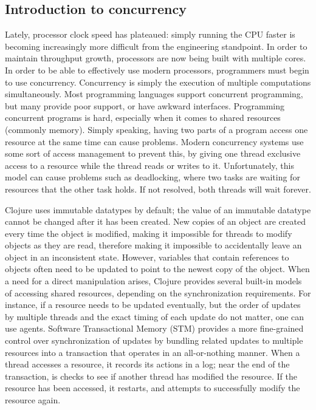 \documentclass[12pt]{article}
\newcommand{\comment}[1]{{\bf \tt  {#1}}}
\newcommand{\emcomment}[1]{\textcolor{ForestGreen}{\comment{Elena: {#1}}}}
\begin{document}
\subsection{Introduction to concurrency}\label{sec:concurrency}
 Lately, processor clock speed has plateaued: simply running the CPU faster is becoming increasingly more difficult from the engineering standpoint. 
In order to maintain throughput growth, processors are now being built with multiple cores. In order to be able to effectively use modern processors, programmers must begin to use concurrency. Concurrency is simply the execution of multiple computations simultaneously. Most programming languages support concurrent programming, but many provide poor support, or have awkward interfaces. 
Programming concurrent programs is hard, especially when it comes to shared resources (commonly memory). Simply speaking, having two parts of a program access one resource at the same time can cause problems. Modern concurrency systems use some sort of access management to prevent this, by giving one thread exclusive access to a resource while the thread reads or writes to it. Unfortunately, this model can cause problems such as deadlocking, where two tasks are waiting for resources that the other task holds. If not resolved, both threads will wait forever. 

Clojure uses immutable datatypes by default; the value of an immutable datatype cannot be changed after it has been created. New copies of an object are created every time the object is modified, making it impossible for threads to modify objects as they are read, therefore making it impossible to accidentally leave an object in an inconsistent state. 
However, variables that contain references to objects often need to be updated to point to the newest copy of the object. When a need for a direct manipulation arises, 
Clojure provides several built-in models of accessing shared resources, depending on the synchronization requirements. For instance, if a resource needs to be updated eventually, but the order of updates by multiple threads and the exact timing of each update do not matter, one can use agents. Software Transactional Memory (STM) provides a more fine-grained control over synchronization of updates by bundling related updates to multiple resources into a transaction that operates in an all-or-nothing manner. When a thread accesses a resource, it records its actions in a log; near the end of the transaction, is checks to see if another thread has modified the resource. If the resource has been accessed, it restarts, and attempts to successfully modify the resource again.
\end{document}
